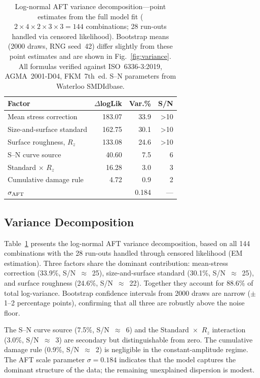 \documentclass[12pt,a4paper]{article}
\begin{document}
\begin{table}[h]
\centering
\caption{Log-normal AFT variance decomposition---point estimates from the
full model fit ($2\times4\times2\times3\times3 = 144$ combinations;
28 run-outs handled via censored likelihood). Bootstrap means
(2000 draws, RNG seed~42) differ slightly from these point estimates
and are shown in Fig.~\ref{fig:variance}.%
All formulas verified against ISO~6336-3:2019, AGMA~2001-D04, FKM~7th~ed.
S--N parameters from Waterloo SMDIdbase.}
\label{tab:anova}
\begin{tabular}{lrrr}
\toprule
Factor & $\Delta$logLik & Var.\% & S/N \\
\midrule
Mean stress correction      & 183.07 & 33.9 & >10 \\
Size-and-surface standard   & 162.75 & 30.1 & >10 \\
Surface roughness, $R_z$    & 133.08 & 24.6 & >10 \\
S--N curve source           &  40.60 &  7.5 &  ~6 \\
Standard $\times$ $R_z$     &  16.28 &  3.0 &  ~3 \\
Cumulative damage rule      &   4.72 &  0.9 &  ~2 \\
\midrule
$\sigma_{\rm AFT}$          &        & 0.184 & --- \\
\bottomrule
\end{tabular}
\end{table}

\subsection{Variance Decomposition}

Table~\ref{tab:anova} presents the log-normal AFT variance
decomposition, based on all 144 combinations with the 28 run-outs
handled through censored likelihood (EM estimation). Three factors share the
dominant contribution: mean-stress correction (33.9\%, S/N~$\approx$~25),
size-and-surface standard (30.1\%, S/N~$\approx$~25), and surface roughness
(24.6\%, S/N~$\approx$~22). Together they account for 88.6\% of total
log-variance. Bootstrap confidence intervals from 2000 draws are narrow
($\pm$1--2 percentage points), confirming that all three are robustly
above the noise floor.

The S--N curve source (7.5\%, S/N~$\approx$~6) and the
Standard~$\times$~$R_z$ interaction (3.0\%, S/N~$\approx$~3) are secondary but
distinguishable from zero. The cumulative damage rule (0.9\%,
S/N~$\approx$~2) is negligible in the constant-amplitude regime. The
AFT scale parameter $\sigma = 0.184$ indicates that the model
captures the dominant structure of the data; the remaining
unexplained dispersion is modest.
\end{document}
